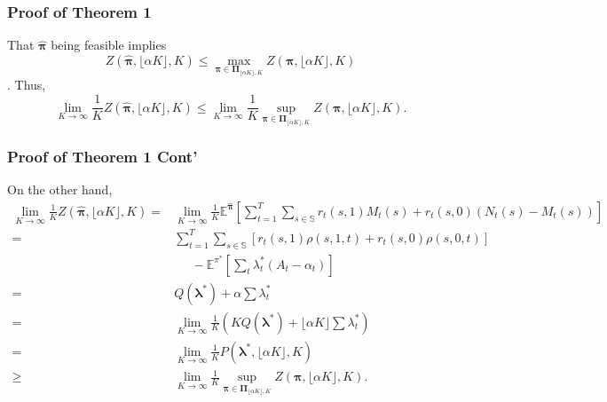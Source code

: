 \documentclass{beamer}
\newcommand{\Eb}{\mathbb{E}}
\newcommand{\lambdav}{\pmb{\lambda}}
\newcommand{\allp}{\pmb{\pi}}
\newcommand{\allpset}{\mathbf{\Pi}}
\newcommand{\subp}{\pi}
\newcommand{\substates}{\mathbb{S}}
\begin{document}
\begin{frame}
\frametitle{Proof of Theorem 1}
That $\hat{\allp}$ being feasible implies $$Z(\hat{\allp},\lfloor \alpha K\rfloor,K) \leq \max_{\allp\in\allpset_{\lfloor \alpha K\rfloor,K}}Z(\allp,\lfloor \alpha K\rfloor,K)$$.  Thus,
\begin{equation*}
\lim_{K\rightarrow\infty}\frac{1}{K}Z(\hat{\allp},\lfloor \alpha K\rfloor,K) \leq  \lim_{K\rightarrow\infty}\frac{1}{K}\sup_{\allp\in\allpset_{\lfloor \alpha K\rfloor,K}}Z(\allp,\lfloor \alpha K\rfloor,K).
\end{equation*}
\end{frame}

\begin{frame}
\frametitle{Proof of Theorem 1 Cont'}
On the other hand,
\footnotesize
\begin{align*}
\lim_{K\rightarrow\infty}\frac{1}{K}Z(\hat{\allp},\lfloor \alpha K\rfloor,K) 
=&\lim_{K\rightarrow\infty}\frac{1}{K}\Eb^{\hat{\allp}}\left[\sum_{t=1}^{T}\sum_{s\in\substates}r_t(s,1) M_{t}(s)+r_t(s,0) (N_{t}(s)-M_{t}(s))\right]\\
=&\sum_{t=1}^{T}\sum_{s\in \substates}\left[r_t(s,1) \rho(s,1,t)+r_t(s,0) \rho(s,0,t) \right]\\
&\;\;\;\;\;-\mathbb{E}^{\subp^*}\left[\sum_{t}\lambda^*_t \left(A_t-\alpha_t\right)\right]\\
=& Q(\lambdav^*)+\alpha \sum\lambda^*_t\\
=& \lim_{K\rightarrow\infty}\frac{1}{K}(KQ(\lambdav^*)+\lfloor \alpha K \rfloor\sum\lambda^*_t)\\
=& \lim_{K\rightarrow\infty}\frac{1}{K} P(\lambdav^*,\lfloor \alpha K \rfloor, K)\\
\geq& \lim_{K\rightarrow\infty}\frac{1}{K}\sup_{\allp\in\allpset_{\lfloor \alpha K\rfloor,K}}Z(\allp,\lfloor \alpha K\rfloor,K).
\end{align*}
\end{frame}
\end{document}
